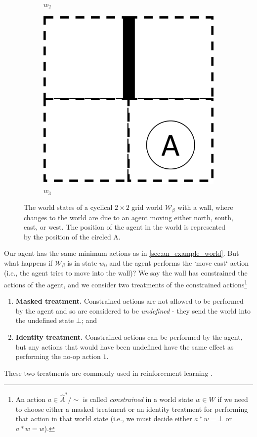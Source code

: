 \begin{figure}[H]
\begin{subfigure}[b]{0.45\linewidth}
        \caption{$w_{2}$}
    \end{subfigure}
    \begin{subfigure}[b]{0.45\linewidth}
        \centering
        \includegraphics[width=0.5\linewidth]{5BeyondSBDRL/GlobalAlgebras/Images/2x2_with_wall_world_states/w3.png}
        \caption{$w_{3}$}
    \end{subfigure}
  \caption{
  The world states of a cyclical $2\times 2$ grid world $\mathscr{W}_{\beta}$ with a wall, where changes to the world are due to an agent moving either north, south, east, or west.
  The position of the agent in the world is represented by the position of the circled A.
  }
\label{fig:2x2_cyclical_grid_world_wall_states}
\end{figure}

Our agent has the same minimum actions as in \cref{sec:an_example_world}.
But what happens if $\mathscr{W}_{\beta}$ is in state $w_{0}$ and the agent performs the `move east` action (i.e., the agent tries to move into the wall)?
We say the wall has constrained the actions of the agent, and we consider two treatments of the constrained actions\footnote{
An action $a \in \hat{A}^{*}/\sim$ is called \emph{constrained} in a world state $w \in W$ if we need to choose either a masked treatment or an identity treatment for performing that action in that world state (i.e., we must decide either $a * w = \bot$ or $a * w = w$).
}
\begin{enumerate}[(1)]
    \item \textbf{Masked treatment.}
    Constrained actions are not allowed to be performed by the agent and so are considered to be \emph{undefined} - they send the world into the undefined state $\bot$; and
    \item \textbf{Identity treatment.}
    Constrained actions can be performed by the agent, but any actions that would have been undefined have the same effect as performing the no-op action $1$.
\end{enumerate}
These two treatments are commonly used in reinforcement learning .


